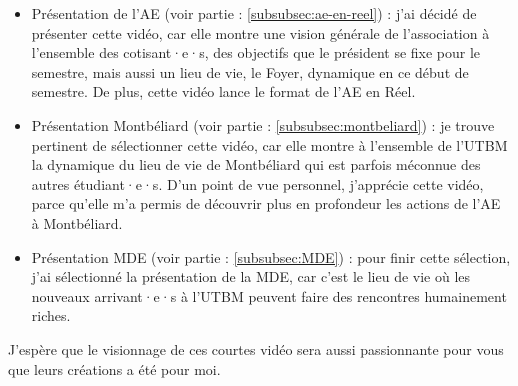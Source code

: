 \begin{itemize}
    \item Présentation de l'\gls{AE} (voir partie : \ref{subsubsec:ae-en-reel}) : j'ai décidé de présenter cette vidéo, car elle montre une vision générale de l'association à l'ensemble des cotisant·e·s, des objectifs que le président se fixe pour le semestre, mais aussi un lieu de vie, le Foyer, dynamique en ce début de semestre.
    De plus, cette vidéo lance le format de l'\gls{AE} en Réel.
    \item Présentation Montbéliard (voir partie : \ref{subsubsec:montbeliard}) : je trouve pertinent de sélectionner cette vidéo, car elle montre à l'ensemble de l'\gls{UTBM} la dynamique du lieu de vie de Montbéliard qui est parfois méconnue des autres étudiant·e·s.
    D'un point de vue personnel, j'apprécie cette vidéo, parce qu'elle m'a permis de découvrir plus en profondeur les actions de l'\gls{AE} à Montbéliard.
    \item Présentation MDE (voir partie : \ref{subsubsec:MDE}) : pour finir cette sélection, j'ai sélectionné la présentation de la MDE, car c'est le lieu de vie où les nouveaux arrivant·e·s à l'\gls{UTBM} peuvent faire des rencontres humainement riches.
\end{itemize}


J'espère que le visionnage de ces courtes vidéo sera aussi passionnante pour vous que leurs créations a été pour moi.